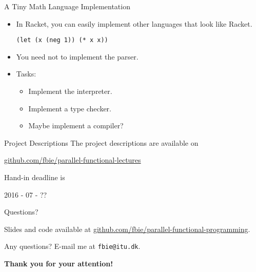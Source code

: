 \documentclass{beamer}
\begin{document}
\begin{frame}[fragile]{A Tiny Math Language Implementation}
  \begin{itemize}
  \item In Racket, you can easily implement other languages that look like Racket.
    \begin{lstlisting}[style=Racket]
(let (x (neg 1)) (* x x))
    \end{lstlisting}
  \pause{} \item You need not to implement the parser.
  \pause{} \item Tasks:
    \begin{itemize}
    \item Implement the interpreter.
    \item Implement a type checker.
    \item Maybe implement a compiler?
    \end{itemize}
  \end{itemize}
\end{frame}

\begin{frame}{Project Descriptions}
  The project descriptions are available on

  \begin{center}
    \url{github.com/fbie/parallel-functional-lectures}
  \end{center}

  Hand-in deadline is

  \begin{center}
    2016 - 07 - ??
  \end{center}
\end{frame}

\begin{frame}{Questions?}
  \begin{center}
    Slides and code available at \url{github.com/fbie/parallel-functional-programming}.
  \end{center}

  \pause{}

  \begin{center}
    Any questions? E-mail me at \texttt{fbie@itu.dk}.
  \end{center}

  \pause{}

  \begin{center}
    \textbf{Thank you for your attention!}
  \end{center}
\end{frame}
\end{document}
